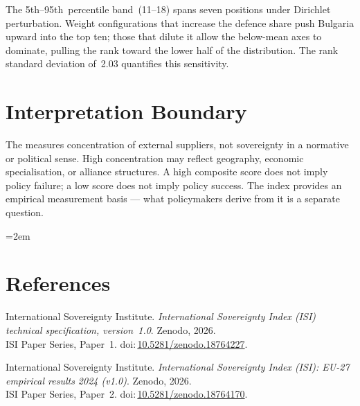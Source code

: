 \documentclass[12pt,a4paper]{article}
\begin{document}
The 5th--95th~percentile band~(11--18) spans seven positions under Dirichlet perturbation.  Weight configurations that increase the defence share push Bulgaria upward into the top ten; those that dilute it allow the below-mean axes to dominate, pulling the rank toward the lower half of the distribution.  The rank standard deviation of~2.03 quantifies this sensitivity.


\section{Interpretation Boundary}
\label{sec:interpretation}

The \ISI measures concentration of external suppliers, not sovereignty in a normative or political sense.  High concentration may reflect geography, economic specialisation, or alliance structures.  A high composite score does not imply policy failure; a low score does not imply policy success.  The index provides an empirical measurement basis --- what policymakers derive from it is a separate question.


\clearpage
\vspace*{1.5cm}

\begingroup\emergencystretch=2em
\section*{References}

\begin{enumerate}[label={[\arabic*]},leftmargin=2em,itemsep=6pt]
\item International Sovereignty Institute.
  \textit{International Sovereignty Index (ISI) technical specification, version~1.0}.
  Zenodo, 2026.\\ISI Paper Series, Paper~1.
  doi:\,\href{https://doi.org/10.5281/zenodo.18764227}{10.5281/zenodo.18764227}.

\item International Sovereignty Institute.
  \textit{International Sovereignty Index (ISI): EU-27 empirical results 2024 (v1.0)}.
  Zenodo, 2026.\\ISI Paper Series, Paper~2.
  doi:\,\href{https://doi.org/10.5281/zenodo.18764170}{10.5281/zenodo.18764170}.
\end{enumerate}
\endgroup
\end{document}
